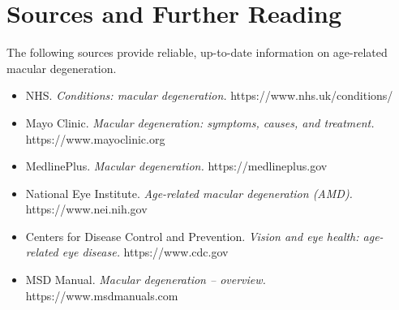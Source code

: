 \section*{Sources and Further Reading}
The following sources provide reliable, up-to-date information on age-related macular degeneration.

\begin{itemize}
    \item NHS. \textit{Conditions: macular degeneration.} https://www.nhs.uk/conditions/
    \item Mayo Clinic. \textit{Macular degeneration: symptoms, causes, and treatment.} https://www.mayoclinic.org
    \item MedlinePlus. \textit{Macular degeneration.} https://medlineplus.gov
    \item National Eye Institute. \textit{Age-related macular degeneration (AMD).} https://www.nei.nih.gov
    \item Centers for Disease Control and Prevention. \textit{Vision and eye health: age-related eye disease.} https://www.cdc.gov
    \item MSD Manual. \textit{Macular degeneration -- overview.} https://www.msdmanuals.com
\end{itemize}
